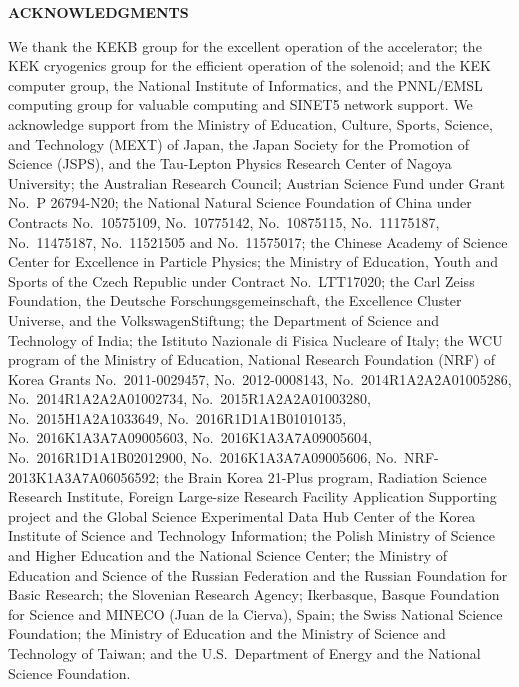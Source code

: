 \documentclass[aps,prl,twocolumn,superscriptaddress,showpacs,preprintnumbers,amsmath,amssymb]{revtex4-1}
\begin{document}
\begin{center}
\textbf{ACKNOWLEDGMENTS}
\end{center}
We thank the KEKB group for the excellent operation of the
accelerator; the KEK cryogenics group for the efficient
operation of the solenoid; and the KEK computer group,
the National Institute of Informatics, and the 
PNNL/EMSL computing group for valuable computing
and SINET5 network support.  We acknowledge support from
the Ministry of Education, Culture, Sports, Science, and
Technology (MEXT) of Japan, the Japan Society for the 
Promotion of Science (JSPS), and the Tau-Lepton Physics 
Research Center of Nagoya University; 
the Australian Research Council;
Austrian Science Fund under Grant No.~P 26794-N20;
the National Natural Science Foundation of China under Contracts 
No.~10575109, No.~10775142, No.~10875115, No.~11175187, No.~11475187, 
No.~11521505 and No.~11575017;
the Chinese Academy of Science Center for Excellence in Particle Physics; 
the Ministry of Education, Youth and Sports of the Czech
Republic under Contract No.~LTT17020;
the Carl Zeiss Foundation, the Deutsche Forschungsgemeinschaft, the
Excellence Cluster Universe, and the VolkswagenStiftung;
the Department of Science and Technology of India; 
the Istituto Nazionale di Fisica Nucleare of Italy; 
the WCU program of the Ministry of Education, National Research Foundation (NRF)
of Korea Grants No.~2011-0029457, No.~2012-0008143,
No.~2014R1A2A2A01005286,
No.~2014R1A2A2A01002734, No.~2015R1A2A2A01003280,
No.~2015H1A2A1033649, No.~2016R1D1A1B01010135, No.~2016K1A3A7A09005603, No.~2016K1A3A7A09005604, No.~2016R1D1A1B02012900,
No.~2016K1A3A7A09005606, No.~NRF-2013K1A3A7A06056592;
the Brain Korea 21-Plus program, Radiation Science Research Institute, Foreign Large-size Research Facility Application Supporting project and the Global Science Experimental Data Hub Center of the Korea Institute of Science and Technology Information;
the Polish Ministry of Science and Higher Education and 
the National Science Center;
the Ministry of Education and Science of the Russian Federation and
the Russian Foundation for Basic Research;
the Slovenian Research Agency;
Ikerbasque, Basque Foundation for Science and
MINECO (Juan de la Cierva), Spain;
the Swiss National Science Foundation; 
the Ministry of Education and the Ministry of Science and Technology of Taiwan;
and the U.S.\ Department of Energy and the National Science Foundation.
\end{document}
